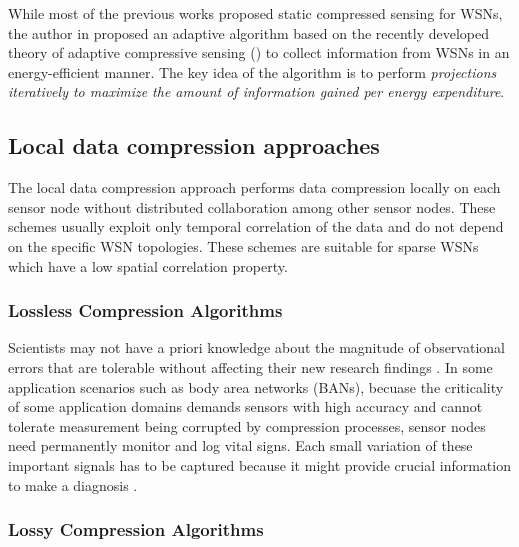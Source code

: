 While most of the previous works proposed \textcolor[rgb]{0,0,1}{static compressed sensing} for WSNs, the author in \cite{Chou2009} proposed an adaptive algorithm based on the recently developed theory of adaptive compressive sensing (\cite{Ji2008, Kho2009}) to \textcolor[rgb]{1,0,0}{collect information from WSNs in an energy-efficient manner}. The key idea of the algorithm is to perform \emph{\textcolor[rgb]{1,0,0}{projections iteratively to maximize the amount of information gained per energy expenditure}}. 


\subsection{Local data compression approaches}
The local data compression approach performs data compression locally on each sensor node without distributed collaboration among other sensor nodes. These schemes usually exploit \textcolor[rgb]{1,0,0}{only temporal correlation of the data} and \textcolor[rgb]{1,0,0}{do not depend on the specific WSN topologies}. These schemes are suitable for \textcolor[rgb]{1,0,0}{sparse WSNs which have a low spatial correlation property}. 

\subsubsection{Lossless Compression Algorithms}

Scientists may not have a priori knowledge about the magnitude of observational errors that are tolerable without affecting their new research findings \cite{Liang2010}. In some application scenarios such as body area networks (BANs), becuase the criticality of some application domains demands sensors with high accuracy and cannot tolerate measurement being corrupted by compression processes, sensor nodes need permanently monitor and log vital signs. Each small variation of these important signals has to be captured because it might provide crucial information to make a diagnosis \cite{Marcelloni2009}.
\subsubsection{Lossy Compression Algorithms}


